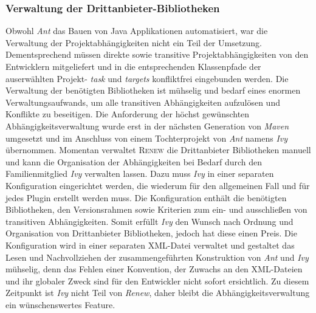 		\subsubsection{Verwaltung der Drittanbieter-Bibliotheken}%
		Obwohl \textit{Ant} das Bauen von Java Applikationen automatisiert, war die Verwaltung der Projektabhängigkeiten nicht ein Teil der Umsetzung. Dementsprechend müssen direkte sowie transitive Projektabhängigkeiten von den Entwicklern mitgeliefert und in die entsprechenden Klassenpfade der auserwählten Projekt- \textit{task} und \textit{targets} konfliktfrei eingebunden werden.\newline
		Die Verwaltung der benötigten Bibliotheken ist mühselig und bedarf eines enormen Verwaltungsaufwands, um alle transitiven Abhängigkeiten aufzulösen und Konflikte zu beseitigen. Die Anforderung der höchst gewünschten Abhängigkeitsverwaltung wurde erst in der nächsten Generation von \textit{Maven} umgesetzt und im Anschluss von einem Tochterprojekt von \textit{Ant} namens \textit{Ivy} übernommen.\newline
		Momentan verwaltet \textsc{Renew} die Drittanbieter Bibliotheken manuell und kann die Organisation der Abhängigkeiten bei Bedarf durch den Familienmitglied \textit{Ivy} verwalten lassen. Dazu muss \textit{Ivy} in einer separaten Konfiguration eingerichtet werden, die wiederum für den allgemeinen Fall und für jedes Plugin erstellt werden muss. Die Konfiguration enthält die benötigten Bibliotheken, den Versionsrahmen sowie Kriterien zum ein- und ausschließen von transitiven Abhängigkeiten. \newline
		Somit erfüllt \textit{Ivy} den Wunsch nach Ordnung und Organisation von Drittanbieter Bibliotheken, jedoch hat diese einen Preis. Die Konfiguration wird in einer separaten XML-Datei verwaltet und gestaltet das Lesen und Nachvollziehen der zusammengeführten Konstruktion von \textit{Ant} und \textit{Ivy} mühselig, denn das Fehlen einer Konvention, der Zuwachs an den XML-Dateien und ihr globaler Zweck sind für den Entwickler nicht sofort ersichtlich.\newline
		Zu diesem Zeitpunkt ist \textit{Ivy} nicht Teil von \textit{Renew}, daher bleibt die Abhängigkeitsverwaltung ein wünschenswertes Feature.

